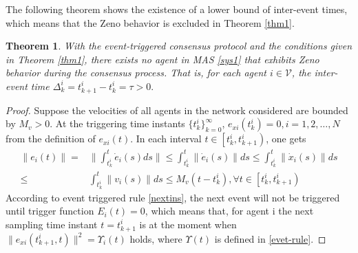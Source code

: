 \documentclass[review]{elsarticle}
\newtheorem{thm}{Theorem}
\begin{document}
The following theorem shows the existence of a lower bound of inter-event times, which means that the Zeno behavior is excluded in Theorem \ref{thm1}.
\begin{thm}\label{thm2}
	With the event-triggered consensus protocol and the conditions given in Theorem \ref{thm1},  there exists no agent in MAS \eqref{sys1} that exhibits Zeno behavior during the consensus process. That is, for each agent $i\in \mathcal{V}$, the inter-event time $\Delta_{k}^i = t_{k+1}^i - t_{k}^i = \tau>0 . $  
\end{thm}
\begin{proof}
	Suppose the velocities of all agents in the network considered are bounded by $M_v>0$. 
	At the triggering time instants $\{t^i_k\}_{k=0}^{\infty}$, $e_{xi}(t^i_k) = 0, i=1,2,\ldots,N$ from the definition of $e_{xi}(t)$. 
	In each interval $t\in \left[t_k^i,t_{k+1}^i \right)$, one gets
	\begin{equation}\label{4-2-1}
	\begin{split}
	\|e_i(t)\| =& \|\int_{t_{k}^i}^{t}\dot e_i(s)ds \|\leq \int_{t_{k}^i}^{t}\|\dot e_i(s)\|ds \leq  \int_{t_{k}^i}^{t}\|\dot x_i(s)\|ds\\
	\leq&    \int_{t_{k}^i}^{t}\|v_i(s)\|ds \leq M_v(t-t_{k}^i), \forall t\in \left[t_k^i,t_{k+1}^i \right)
	\end{split}
	\end{equation}
	According to event triggered rule \eqref{nextins}, the next event will not be triggered until trigger function $E_i(t)= 0$, which means that, for agent i the next sampling time instant $t= t_{k+1}^i$ is at the moment when $\|e_{xi}(t_{k+1}^i,t)\|^2 =  {\varUpsilon_i(t)}$ holds, where $\Upsilon(t)$ is defined in \eqref{evet-rule}.
	

\end{proof}
\end{document}

